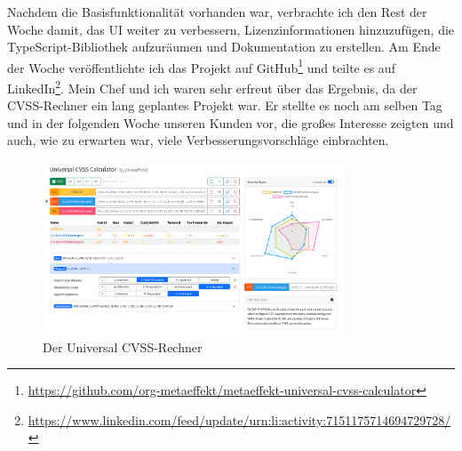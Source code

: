 Nachdem die Basisfunktionalität vorhanden war, verbrachte ich den Rest der Woche damit, das UI weiter zu verbessern, Lizenzinformationen hinzuzufügen, die TypeScript-Bibliothek aufzuräumen und Dokumentation zu erstellen.
Am Ende der Woche veröffentlichte ich das Projekt auf GitHub\footnote{\url{https://github.com/org-metaeffekt/metaeffekt-universal-cvss-calculator}} und teilte es auf LinkedIn\footnote{\url{https://www.linkedin.com/feed/update/urn:li:activity:7151175714694729728/}}.
Mein Chef und ich waren sehr erfreut über das Ergebnis, da der CVSS-Rechner ein lang geplantes Projekt war.
Er stellte es noch am selben Tag und in der folgenden Woche unseren Kunden vor, die großes Interesse zeigten und auch, wie zu erwarten war, viele Verbesserungsvorschläge einbrachten.

\begin{figure}[htbp] %
    \centering
    \includegraphics[width=0.8\textwidth, keepaspectratio]{res/img/metaeffekt-cvss-calculator-ui}
    \caption{Der \metaeffekt Universal CVSS-Rechner}
    \label{fig:metaeffekt-cvss-calculator-ui}
\end{figure}
